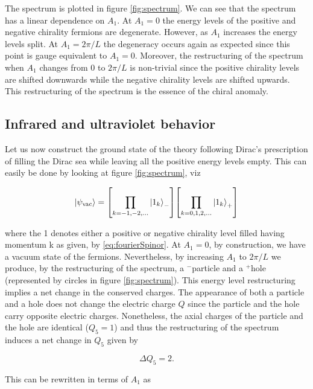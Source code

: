 The spectrum is plotted in figure \ref{fig:spectrum}. We can see that the spectrum has a linear dependence on $A_1$. At $A_1=0$ the energy levels of the positive and negative chirality fermions are degenerate. However, as $A_1$ increases the energy levels split. At $A_1=2\pi/L$ the degeneracy occurs again as expected since this point is gauge equivalent to $A_1=0$. Moreover, the restructuring of the spectrum when $A_1$ changes from $0$ to $2\pi/L$ is non-trivial since the positive chirality levels are shifted downwards while the negative chirality levels are shifted upwards. This restructuring of the spectrum is the essence of the chiral anomaly.

\subsection{Infrared and ultraviolet behavior}\label{ssec:SpectrumIR}

Let us now construct the ground state of the theory following Dirac's prescription of filling the Dirac sea while leaving all the positive energy levels empty. This can easily be done by looking at figure \ref{fig:spectrum}, viz

\begin{equation}
    \ket{\psi_\text{vac}} = \qty[\prod_{k=-1,-2,\ldots}\ket{1_k}_-]\qty[\prod_{k=0,1,2,\ldots}\ket{1_k}_+]
    \label{eq:gsk}
\end{equation}

where the 1 denotes either a positive or negative chirality level filled having momentum k as given, by \eqref{eq:fourierSpinor}. At $A_1=0$, by construction, we have a vacuum state of the fermions. Nevertheless, by increasing $A_1$ to $2\pi/L$ we produce, by the restructuring of the spectrum, a $^-$particle and a $^+$hole (represented by circles in figure \ref{fig:spectrum}). This energy level restructuring implies a net change in the conserved charges. The appearance of both a particle and a hole does not change the electric charge $Q$ since the particle and the hole carry opposite electric charges. Nonetheless, the axial charges of the particle and the hole are identical ($Q_5=1$) and thus the restructuring of the spectrum induces a net change in $Q_5$ given by

\begin{equation}
\Delta Q_5 = 2 \label{eq:q5change}.
\end{equation}

This can be rewritten in terms of $A_1$ as

